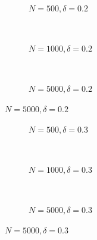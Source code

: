 \documentclass{beamer}
\begin{document}
\begin{frame}
\begin{figure}[h]
  \scriptsize
  \begingroup
  \centering
  \begin{subfigure}[b]{0.31\textwidth}
\caption{\footnotesize $N=500, \delta = 0.2$}
  
  \end{subfigure}
  ~
  \begin{subfigure}[b]{0.31\textwidth}
    \caption{\footnotesize $N=1000, \delta = 0.2$} 
  
  \end{subfigure}
 ~ 
  \begin{subfigure}[b]{0.31\textwidth}
\caption{\footnotesize $N=5000, \delta = 0.2$}
  
  \end{subfigure}
\endgroup
\end{figure}
\end{frame}
\begin{frame}
\begin{figure}[h]
  \scriptsize
  \begingroup
  \centering
  \begin{subfigure}[b]{0.31\textwidth}
\caption{\footnotesize $N=500, \delta = 0.3$}
  
  \end{subfigure}
  ~
  \begin{subfigure}[b]{0.31\textwidth}
    \caption{\footnotesize $N=1000, \delta = 0.3$} 
  
  \end{subfigure}
 ~ 
  \begin{subfigure}[b]{0.31\textwidth}
\caption{\footnotesize $N=5000, \delta = 0.3$}
  
  \end{subfigure}
\endgroup
\end{figure}
\end{frame}
\end{document}
